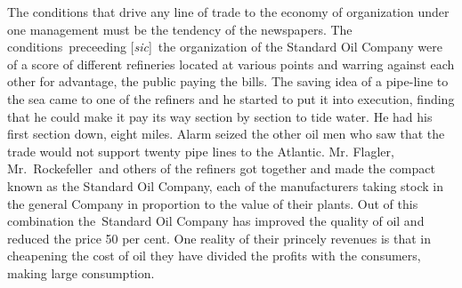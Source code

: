 \documentclass[twoside,symmetric,nobib,justified]{tufte-book}
\begin{document}
\enlargethispage{\baselineskip}

The conditions that drive any line of trade to the economy of
organization under one management must be the tendency of the
newspapers. The conditions~preceeding {[}\emph{sic}{]}~the organization
of the Standard Oil Company were of a score of different refineries
located at various points and warring against each other for advantage,
the public paying the bills. The saving idea of a pipe-line to the sea
came to one of the refiners and he started to put it into execution,
finding that he could make it pay its way section by section to tide
water. He had his first section down, eight miles. Alarm seized the
other oil men who saw that the trade would not support twenty pipe lines
to the Atlantic. Mr. Flagler, Mr.~Rockefeller~and others of the refiners
got together and made the compact known as the Standard Oil Company,
each of the manufacturers taking stock in the general Company in
proportion to the value of their plants. Out of this combination
the~Standard Oil Company has improved the quality of oil and reduced the
price 50 per cent. One reality of their princely revenues is that in
cheapening the cost of oil they have divided the profits with the
consumers, making large consumption.~
\end{document}
